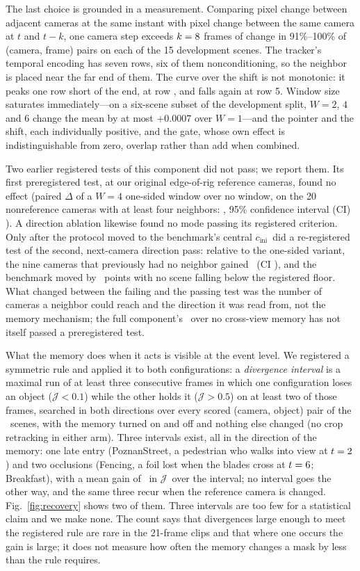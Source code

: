 \documentclass[journal]{IEEEtran}
\newcommand{\Jscore}{\ensuremath{\mathcal{J}}}
\newcommand{\cini}{\ensuremath{c_{\mathrm{ini}}}}
\begin{document}
The last choice is grounded in a measurement. Comparing pixel change between
adjacent cameras at the same instant with pixel change between the same camera
at $t$ and $t-k$, one camera step exceeds $k=8$ frames of change
in 91\%--100\% of (camera, frame) pairs on each of the 15 development
scenes. The tracker's temporal encoding has seven rows, six of them
nonconditioning, so the neighbor is placed near the far end of them. The
curve over the shift is not monotonic: it peaks one row short of the end, at
row \xviewRow, and falls again at row 5. Window size saturates
immediately---on a six-scene subset of the development split, $W=2$, $4$ and
$6$ change the mean by at most $+0.0007$ over $W=1$---and the pointer and the
shift, each individually positive, and the gate, whose own effect is
indistinguishable from zero, overlap rather than add when combined.

Two earlier registered tests of this component did not pass; we report them. Its first preregistered test, at our original edge-of-rig reference
cameras, found no effect (paired $\Delta$ of a $W=4$ one-sided window over no
window, on the 20 nonreference cameras with at least four neighbors:
\firstTestDelta, 95\% confidence interval (CI) \firstTestCI). A direction
ablation likewise found no mode passing its registered criterion. Only after
the protocol moved to the benchmark's central \cini\ did a re-registered test
of the second, next-camera direction pass: relative to the one-sided variant,
the nine cameras that previously had no neighbor gained
\ciniTestDelta\ (CI \ciniTestCI), and the benchmark moved by \ciniTestScenes\
points with no scene falling below the registered floor. What changed between
the failing and the passing test was the number of cameras a neighbor could
reach and the direction it was read from, not the memory mechanism; the full
component's \gainXview\ over no cross-view memory has not itself passed a
preregistered test.

What the memory does when it acts is visible at the event level. We
registered a symmetric rule and applied it to both configurations: a
\emph{divergence interval} is a maximal run of at least three consecutive
frames in which one configuration loses an object ($\Jscore<0.1$) while the
other holds it ($\Jscore>0.5$) on at least two of those frames, searched in
both directions over every scored (camera, object) pair of the \nScenes\
scenes, with the memory turned on and off and nothing else changed (no crop
retracking in either arm). Three intervals exist, all in the direction of the
memory: one late entry (PoznanStreet, a pedestrian who walks into view at
$t=2$) and two occlusions (Fencing, a foil lost when the blades
cross at $t=6$; Breakfast), with a mean gain of
\xrGainPerInterval\ in \Jscore\ over the interval; no interval goes the other
way, and the same three recur when the reference camera is changed.
Fig.~\ref{fig:recovery} shows two of them. Three intervals are too few for a
statistical claim and we make none. The count says that divergences large
enough to meet the registered rule are rare in the 21-frame clips and that
where one occurs the gain is large; it does not measure how often the memory
changes a mask by less than the rule requires.
\end{document}
